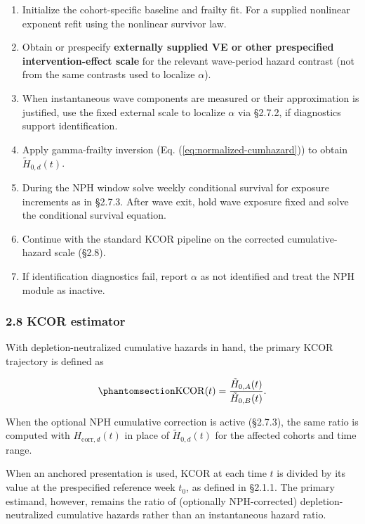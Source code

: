 \documentclass[
]{article}
\providecommand{\tightlist}{%
  \setlength{\itemsep}{0pt}\setlength{\parskip}{0pt}}
\begin{document}
\begin{enumerate}
\def\labelenumi{\arabic{enumi}.}
\tightlist
\item
  Initialize the cohort-specific baseline and frailty fit. For a supplied nonlinear exponent refit using the nonlinear survivor law.
\item
  Obtain or prespecify \textbf{externally supplied VE or other prespecified intervention-effect scale} for the relevant wave-period hazard contrast (not from the same contrasts used to localize \(\alpha\)).
\item
  When instantaneous wave components are measured or their approximation is justified, use the fixed external scale to localize \(\alpha\) via §2.7.2, if diagnostics support identification.
\item
  Apply gamma-frailty inversion (Eq. (\ref{eq:normalized-cumhazard})) to obtain \(\tilde H_{0,d}(t)\).
\item
  During the NPH window solve weekly conditional survival for exposure increments as in §2.7.3. After wave exit, hold wave exposure fixed and solve the conditional survival equation.
\item
  Continue with the standard KCOR pipeline on the corrected cumulative-hazard scale (§2.8).
\item
  If identification diagnostics fail, report \(\alpha\) as not identified and treat the NPH module as inactive.
\end{enumerate}

\subsubsection{2.8 KCOR estimator}\label{kcor-estimator}

With depletion-neutralized cumulative hazards in hand, the primary KCOR trajectory is defined as

\begin{equation}\protect\phantomsection\label{eq:kcor-estimator}{\mathrm{KCOR}(t) = \frac{\tilde H_{0,A}(t)}{\tilde H_{0,B}(t)}.}\end{equation}

When the optional NPH cumulative correction is active (§2.7.3), the same ratio is computed with \(H_{\mathrm{corr},d}(t)\) in place of \(\tilde H_{0,d}(t)\) for the affected cohorts and time range.

When an anchored presentation is used, KCOR at each time \(t\) is divided by its value at the prespecified reference week \(t_0\), as defined in §2.1.1. The primary estimand, however, remains the ratio of (optionally NPH-corrected) depletion-neutralized cumulative hazards rather than an instantaneous hazard ratio.
\end{document}
